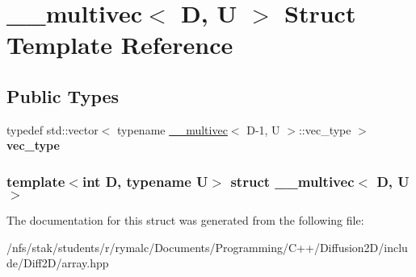 \hypertarget{struct____multivec}{
\section{\_\-\_\-multivec$<$ D, U $>$ Struct Template Reference}
\label{struct____multivec}
}
\subsection*{Public Types}
\begin{DoxyCompactItemize}
\item 
\hypertarget{struct____multivec_a9937ea3f66220e5a8df1af8a1afac678}{
typedef std::vector$<$ typename \hyperlink{struct____multivec}{\_\-\_\-multivec}$<$ D-\/1, U $>$::vec\_\-type $>$ {\bfseries vec\_\-type}}
\label{struct____multivec_a9937ea3f66220e5a8df1af8a1afac678}

\end{DoxyCompactItemize}
\subsubsection*{template$<$int D, typename U$>$ struct \_\-\_\-multivec$<$ D, U $>$}



The documentation for this struct was generated from the following file:\begin{DoxyCompactItemize}
\item 
/nfs/stak/students/r/rymalc/Documents/Programming/C++/Diffusion2D/include/Diff2D/array.hpp\end{DoxyCompactItemize}
